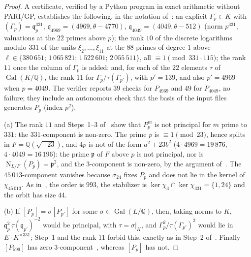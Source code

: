 \documentclass[11pt,a4paper]{amsart}
\theoremstyle{plain}
\theoremstyle{definition}
\newcommand{\Q}{\mathbb{Q}}
\newcommand{\q}{\mathfrak{q}}
\DeclareMathOperator{\Nm}{N}
\DeclareMathOperator{\Gal}{Gal}
\begin{document}
\begin{proof}
A certificate, verified by a Python program in exact arithmetic without PARI/GP, establishes the following, in the notation of~\cite[\S6.4]{Gau26}: an explicit $\Gamma_p\in K$ with $(\Gamma_p)=\q_p^{331}$, $\q_{4969}=(4969,\theta-4770)$, $\q_{4049}=(4049,\theta-512)$ (norm $p^{331}$, valuations at the $22$ primes above $p$); the rank $10$ of the discrete logarithms modulo $331$ of the units $\xi_2,\dots,\xi_{11}$ at the $88$ primes of degree $1$ above $\ell\in\{380\,651;\,1\,065\,821;\,1\,522\,601;\,2\,055\,511\}$, all $\equiv1\pmod{331\cdot115}$; the rank $11$ once the column of $\Gamma_p$ is added; and, for each of the $22$ elements $\tau$ of $\Gal(K/\Q)$, the rank $11$ for $\Gamma_p/\tau(\Gamma_{p'})$, with $p'=139$, and also $p'=4969$ when $p=4049$. The verifier reports $39$ checks for $P_{4969}$ and $49$ for $P_{4049}$, no failure; they include an autonomous check that the basis of the input files generates $P_p$ (index $p^2$).

(a) The rank $11$ and Steps~1--3 of~\cite[\S6.4]{Gau26} show that $P_p^m$ is not principal for $m$ prime to $331$: the $331$-component is non-zero. The prime $p$ is $\equiv1\pmod{23}$, hence splits in $F=\Q(\sqrt{-23})$, and $4p$ is not of the form $a^2+23b^2$ ($4\cdot4969=19\,876$, $4\cdot4049=16\,196$): the prime $\mathfrak p$ of $F$ above $p$ is not principal, nor is $\Nm_{L/F}(P_p)=\mathfrak p^2$, and the $3$-component is non-zero, by the argument of~\cite[Rem.~6.8(a)]{Gau26}. The $45\,013$-component vanishes because $\sigma_{24}$ fixes $P_p$ and does not lie in the kernel of $\chi_{45\,013}$. As in~\cite[Rem.~6.8(a)]{Gau26}, the order is $993$, the stabilizer is $\ker\chi_3\cap\ker\chi_{331}=\{1,24\}$ and the orbit has size $44$.

(b) If $[P_p]=\sigma[P_{p'}]$ for some $\sigma\in\Gal(L/\Q)$, then, taking norms to $K$, $\q_p^2\,\tau(\q_{p'})^{-2}$ would be principal, with $\tau=\sigma|_K$, and $\Gamma_p^2/\tau(\Gamma_{p'})^2$ would lie in $E\cdot K^{\times331}$; Step~1 and the rank $11$ forbid this, exactly as in Step~2 of~\cite[\S6.4]{Gau26}. Finally $[P_{599}]$ has zero $3$-component~\cite[Prop.~6.7]{Gau26}, whereas $[P_p]$ has not.
\end{proof}
\end{document}
